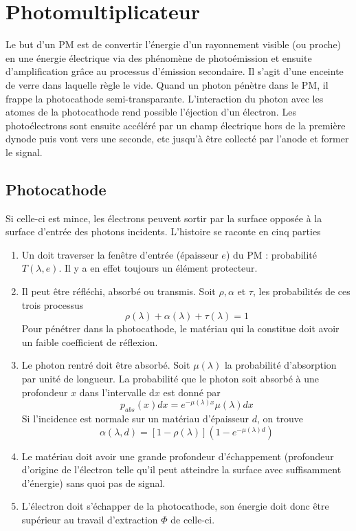 \newpage
\section{Photomultiplicateur}%
Le but d'un PM est de convertir l'énergie d'un rayonnement visible (ou proche) en une énergie
électrique via des phénomène de photoémission et ensuite d'amplification grâce au processus
d'émission secondaire. Il s'agit d'une enceinte de verre dans laquelle règle le vide. Quand un
photon pénètre dans le PM, il frappe la photocathode semi-transparante. L'interaction du photon 
avec les atomes de la photocathode rend possible l'éjection d'un électron. Les photoélectrons 
sont ensuite accéléré par un champ électrique hors de la première dynode puis vont vers une 
seconde, etc jusqu'à être collecté par l'anode et former le signal. 



\subsection{Photocathode}%
Si celle-ci est mince, les électrons peuvent sortir par la surface opposée à la surface d'entrée
des photons incidents. L'histoire se raconte en cinq parties
\begin{enumerate}
\item Un doit traverser la fenêtre d'entrée (épaisseur $e$) du PM : probabilité $T(\lambda,e)$. Il y
a en effet toujours un élément protecteur.
\item Il peut être réfléchi, absorbé ou transmis. Soit $\rho,\alpha$ et $\tau$, les probabilités
de ces trois processus
\begin{equation}
\rho(\lambda)+\alpha(\lambda)+\tau(\lambda)=1
\end{equation}
Pour pénétrer dans la photocathode, le matériau qui la constitue doit avoir un faible coefficient
de réflexion.
\item Le photon rentré doit être absorbé. Soit $\mu(\lambda)$ la probabilité d'absorption par 
unité de longueur. La probabilité que le photon soit absorbé à une profondeur $x$ dans l'intervalle
d$x$ est donné par
\begin{equation}
p_{abs}(x)dx=e^{-\mu(\lambda) x}\mu(\lambda) dx
\end{equation}
Si l'incidence est normale sur un matériau d'épaisseur $d$, on trouve
\begin{equation}
\alpha(\lambda,d)=[1-\rho(\lambda)]\left(1-e^{-\mu(\lambda)d}\right)
\end{equation}
\item Le matériau doit avoir une grande profondeur d'échappement (profondeur d'origine de 
l'électron telle qu'il peut atteindre la surface avec suffisamment d'énergie) sans quoi pas de 
signal.
\item L'électron doit s'échapper de la photocathode, son énergie doit donc être supérieur au 
travail d'extraction $\Phi$ de celle-ci.
\end{enumerate}\ \\

